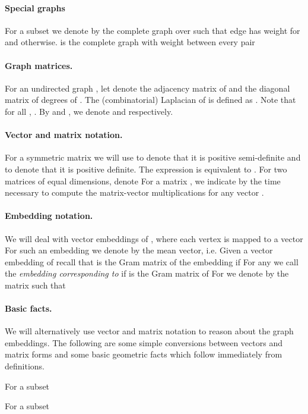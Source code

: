 \documentclass[twoside,leqno,twocolumn]{article}
\numberwithin{equation}{section}
\begin{document}
\paragraph{Special graphs}
For a subset  we denote by  the complete graph over  such that edge  has weight  for  and  otherwise.  is the complete graph with weight  between every pair 




\paragraph{Graph matrices.} For an undirected graph , let
 denote the adjacency matrix of  and  the diagonal matrix of
degrees of .
The (combinatorial) Laplacian of  is defined as .
Note that for all , .
By  and , we denote  and  respectively.




\paragraph*{Vector and matrix notation.}

For a symmetric matrix  we will use  to denote that it is positive semi-definite and  to denote that it is positive definite.
The expression  is equivalent to . For two matrices  of equal dimensions, denote  
For a matrix , we indicate by  the time necessary to compute the matrix-vector multiplications  for any vector . 



\paragraph{Embedding notation.} We will deal with vector embeddings of , where each vertex  is mapped to a vector  For such an embedding  we denote by  the mean vector, i.e. 
Given a vector embedding of  recall that  is the Gram matrix of the embedding if  For any  we call  the {\it embedding corresponding to } if  is the Gram matrix of  
For  we denote by  the matrix such that 




\paragraph{Basic facts.} We will alternatively use vector and matrix notation to reason about the graph embeddings. 
The following are some simple conversions between vectors and matrix forms and some basic geometric facts which follow immediately from definitions.
\begin{fact}\label{fct:mean}

\end{fact}
\begin{fact} \label{fct:star} For a subset  

\end{fact}
\begin{fact} \label{fct:subset}
For a subset  
\end{fact}
\end{document}
